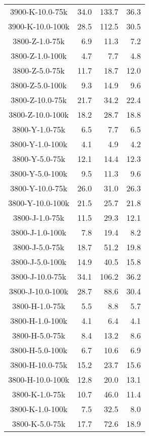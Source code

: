 \begin{longtable}{crrr}
    3900-K-10.0-75k  &   34.0 &  133.7 &   36.3 \\
    3900-K-10.0-100k &   28.5 &  112.5 &   30.5 \\
    3800-Z-1.0-75k   &    6.9 &   11.3 &    7.2 \\
    3800-Z-1.0-100k  &    4.7 &    7.7 &    4.8 \\
    3800-Z-5.0-75k   &   11.7 &   18.7 &   12.0 \\
    3800-Z-5.0-100k  &    9.3 &   14.9 &    9.6 \\
    3800-Z-10.0-75k  &   21.7 &   34.2 &   22.4 \\
    3800-Z-10.0-100k &   18.2 &   28.7 &   18.8 \\
    3800-Y-1.0-75k   &    6.5 &    7.7 &    6.5 \\
    3800-Y-1.0-100k  &    4.1 &    4.9 &    4.2 \\
    3800-Y-5.0-75k   &   12.1 &   14.4 &   12.3 \\
    3800-Y-5.0-100k  &    9.5 &   11.3 &    9.6 \\
    3800-Y-10.0-75k  &   26.0 &   31.0 &   26.3 \\
    3800-Y-10.0-100k &   21.5 &   25.7 &   21.8 \\
    3800-J-1.0-75k   &   11.5 &   29.3 &   12.1 \\
    3800-J-1.0-100k  &    7.8 &   19.4 &    8.2 \\
    3800-J-5.0-75k   &   18.7 &   51.2 &   19.8 \\
    3800-J-5.0-100k  &   14.9 &   40.5 &   15.8 \\
    3800-J-10.0-75k  &   34.1 &  106.2 &   36.2 \\
    3800-J-10.0-100k &   28.7 &   88.6 &   30.4 \\
    3800-H-1.0-75k   &    5.5 &    8.8 &    5.7 \\
    3800-H-1.0-100k  &    4.1 &    6.4 &    4.1 \\
    3800-H-5.0-75k   &    8.4 &   13.2 &    8.6 \\
    3800-H-5.0-100k  &    6.7 &   10.6 &    6.9 \\
    3800-H-10.0-75k  &   15.2 &   23.7 &   15.6 \\
    3800-H-10.0-100k &   12.8 &   20.0 &   13.1 \\
    3800-K-1.0-75k   &   10.7 &   46.0 &   11.4 \\
    3800-K-1.0-100k  &    7.5 &   32.5 &    8.0 \\
    3800-K-5.0-75k   &   17.7 &   72.6 &   18.9 \\

\end{longtable}
